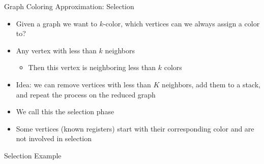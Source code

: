 \documentclass[aspectratio=169]{beamer}
\begin{document}
\begin{frame}{Graph Coloring Approximation: Selection}
    \begin{itemize}
        \item Given a graph we want to $k$-color, which vertices can we always assign a color to?
        \pause
        \item Any vertex with less than $k$ neighbors
        \begin{itemize}
            \item Then this vertex is neighboring less than $k$ colors
        \end{itemize}
        \pause
        \item Idea: we can remove vertices with less than $K$ neighbors, add them to a stack, and repeat the process on the reduced graph
        \item We call this the selection phase
        \pause
        \item Some vertices (known registers) start with their corresponding color and are not involved in selection
    \end{itemize}
\end{frame}

\begin{frame}{Selection Example}
    \begin{columns}
        \begin{column}{1cm}
            
        \end{column}
        \begin{column}{8cm}
        \end{column}
    \end{columns}
\end{frame}
\end{document}
